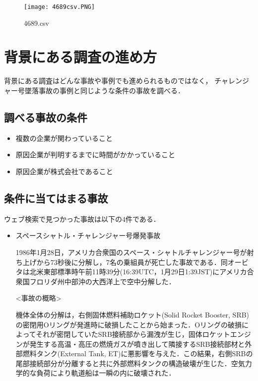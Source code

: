 {\begin{figure}[H]
\centering
\texttt{[image: 4689csv.PNG]}
\caption{4689.csv}\label{サンプル図}
\end{figure}



\section{背景にある調査の進め方}
背景にある調査はどんな事故や事例でも進められるものではなく，
チャレンジャー号墜落事故の事例と同じような条件の事故を調べる．



\subsection{調べる事故の条件}
\begin{itemize}
  \item 複数の企業が関わっていること
  \item 原因企業が判明するまでに時間がかかっていること
  \item 原因企業が株式会社であること

\end{itemize}


\subsection{条件に当てはまる事故}
ウェブ検索で見つかった事故は以下の4件である．
\begin{itemize}
  \item スペースシャトル・チャレンジャー号爆発事故

1986年1月28日，アメリカ合衆国のスペース・シャトルチャレンジャー号が射ち上げから73秒後に分解し，7名の乗組員が死亡した事故である．同オービタは北米東部標準時午前11時39分(16:39UTC，1月29日1:39JST)にアメリカ合衆国フロリダ州中部沖の大西洋上で空中分解した．

<事故の概略>

機体全体の分解は，右側固体燃料補助ロケット(Solid Rocket Booster, SRB)の密閉用Oリングが発進時に破損したことから始まった．Oリングの破損によってそれが密閉していたSRB接続部から漏洩が生じ，固体ロケットエンジンが発生する高温・高圧の燃焼ガスが噴き出して隣接するSRB接続部材と外部燃料タンク(External Tank, ET)に悪影響を与えた．この結果，右側SRBの尾部接続部分が分離すると共に外部燃料タンクの構造破壊が生じた．空気力学的な負荷により軌道船は一瞬の内に破壊された\cite{bakuhatuziko}．


\end{itemize}}

